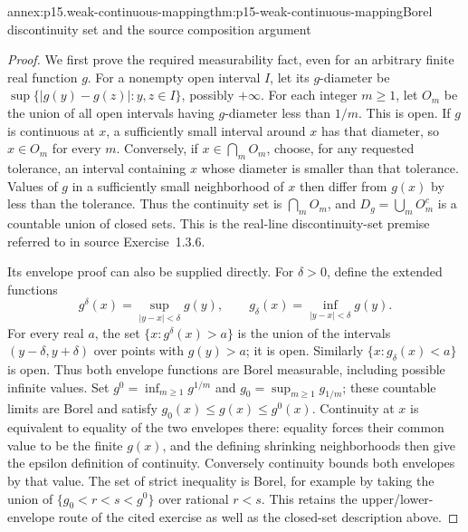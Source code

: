 \begin{annexitem}{annex:p15.weak-continuous-mapping}{thm:p15-weak-continuous-mapping}{Borel discontinuity set and the source composition argument}
\begin{proof}
We first prove the required measurability fact, even for an
arbitrary finite real function \(g\). For a nonempty open interval
\(I\), let its \(g\)-diameter be
\(\sup\{|g(y)-g(z)|:y,z\in I\}\), possibly \(+\infty\).
For each integer \(m\geq1\), let \(O_m\) be the union of
all open intervals having \(g\)-diameter less than \(1/m\).
This is open. If \(g\) is continuous at \(x\), a sufficiently
small interval around \(x\) has that diameter, so \(x\in O_m\)
for every \(m\). Conversely, if \(x\in\bigcap_mO_m\), choose,
for any requested tolerance, an interval containing \(x\)
whose diameter is smaller than that tolerance. Values of \(g\)
in a sufficiently small neighborhood of \(x\) then differ
from \(g(x)\) by less than the tolerance.
Thus the continuity set is \(\bigcap_mO_m\), and
\(D_g=\bigcup_mO_m^c\) is a countable union of closed sets.
This is the real-line discontinuity-set premise referred to
in source Exercise~1.3.6.

Its envelope proof can also be supplied directly. For
\(\delta>0\), define the extended functions
\[
 g^\delta(x)=\sup_{|y-x|<\delta}g(y),\qquad
 g_\delta(x)=\inf_{|y-x|<\delta}g(y).
\]
For every real \(a\), the set \(\{x:g^\delta(x)>a\}\)
is the union of the intervals \((y-\delta,y+\delta)\)
over points with \(g(y)>a\); it is open.
Similarly \(\{x:g_\delta(x)<a\}\) is open.
Thus both envelope functions are Borel measurable, including
possible infinite values. Set
\(g^0=\inf_{m\geq1}g^{1/m}\) and
\(g_0=\sup_{m\geq1}g_{1/m}\); these countable limits are
Borel and satisfy \(g_0(x)\leq g(x)\leq g^0(x)\).
Continuity at \(x\) is equivalent to equality of the two
envelopes there: equality forces their common value to be
the finite \(g(x)\), and the defining shrinking neighborhoods
then give the epsilon definition of continuity.
Conversely continuity bounds both envelopes by that value.
The set of strict inequality is Borel, for example by taking
the union of \(\{g_0<r<s<g^0\}\) over rational \(r<s\).
This retains the upper/lower-envelope route of the cited
exercise as well as the closed-set description above.


\end{proof}
\end{annexitem}
